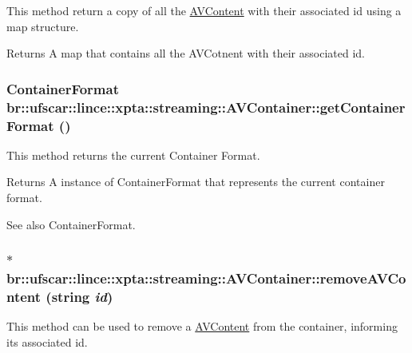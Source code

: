 This method return a copy of all the \hyperlink{classbr_1_1ufscar_1_1lince_1_1xpta_1_1streaming_1_1AVContent}{AVContent} with their associated id using a map structure. 

\begin{DoxyReturn}{Returns}
A map that contains all the AVCotnent with their associated id. 
\end{DoxyReturn}
\hypertarget{classbr_1_1ufscar_1_1lince_1_1xpta_1_1streaming_1_1AVContainer_a4f2e2e221bb4158cd0a4cf28701a3beb}{
\subsubsection[{getContainerFormat}]{\setlength{\rightskip}{0pt plus 5cm}ContainerFormat br::ufscar::lince::xpta::streaming::AVContainer::getContainerFormat ()}}
\label{classbr_1_1ufscar_1_1lince_1_1xpta_1_1streaming_1_1AVContainer_a4f2e2e221bb4158cd0a4cf28701a3beb}


This method returns the current Container Format. 

\begin{DoxyReturn}{Returns}
A instance of ContainerFormat that represents the current container format. 
\end{DoxyReturn}
\begin{DoxySeeAlso}{See also}
ContainerFormat. 
\end{DoxySeeAlso}
\hypertarget{classbr_1_1ufscar_1_1lince_1_1xpta_1_1streaming_1_1AVContainer_a7858bba2c48c8feb2b8cfdaaa0961354}{
\subsubsection[{removeAVContent}]{$\ast$ br::ufscar::lince::xpta::streaming::AVContainer::removeAVContent (string {\em id})}}
\label{classbr_1_1ufscar_1_1lince_1_1xpta_1_1streaming_1_1AVContainer_a7858bba2c48c8feb2b8cfdaaa0961354}


This method can be used to remove a \hyperlink{classbr_1_1ufscar_1_1lince_1_1xpta_1_1streaming_1_1AVContent}{AVContent} from the container, informing its associated id. 


